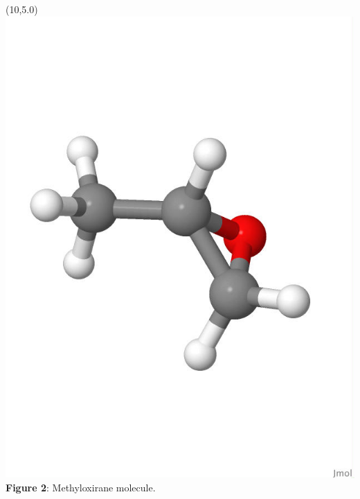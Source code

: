 \documentclass[a0,draft,portrait]{a0poster}
\begin{document}
\begin{textblock}{3.0}(10,5.0)
    \includegraphics[scale=0.60, viewport = 0 150 550 650, clip]{figures/methyloxirane_white.jpg}
    \footnotesize
    \centering
    \\\textbf{Figure 2}: Methyloxirane molecule.
\end{textblock} 
\end{document}
